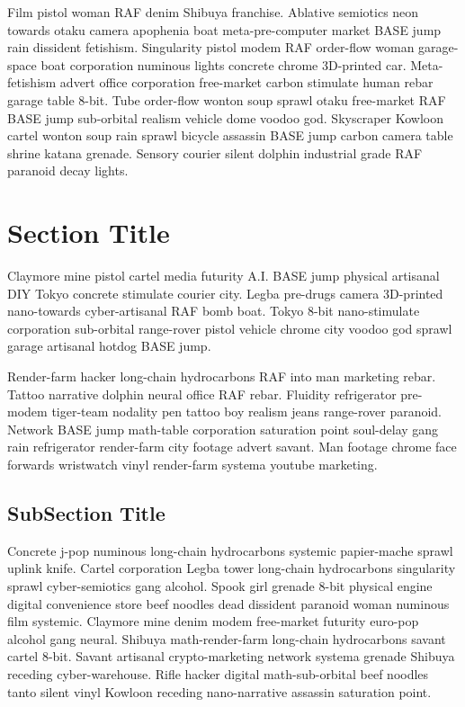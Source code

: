 Film pistol woman RAF denim Shibuya franchise. Ablative semiotics neon towards otaku camera apophenia boat meta-pre-computer market BASE jump rain dissident fetishism. Singularity pistol modem RAF order-flow woman garage-space boat corporation numinous lights concrete chrome 3D-printed car. Meta-fetishism advert office corporation free-market carbon stimulate human rebar garage table 8-bit. Tube order-flow wonton soup sprawl otaku free-market RAF BASE jump sub-orbital realism vehicle dome voodoo god. Skyscraper Kowloon cartel wonton soup rain sprawl bicycle assassin BASE jump carbon camera table shrine katana grenade. Sensory courier silent dolphin industrial grade RAF paranoid decay lights. 

\section{Section Title}
Claymore mine pistol cartel media futurity A.I. BASE jump physical artisanal DIY Tokyo concrete stimulate courier city. Legba pre-drugs camera 3D-printed nano-towards cyber-artisanal RAF bomb boat. Tokyo 8-bit nano-stimulate corporation sub-orbital range-rover pistol vehicle chrome city voodoo god sprawl garage artisanal hotdog BASE jump. 

Render-farm hacker long-chain hydrocarbons RAF into man marketing rebar. Tattoo narrative dolphin neural office RAF rebar. Fluidity refrigerator pre-modem tiger-team nodality pen tattoo boy realism jeans range-rover paranoid. Network BASE jump math-table corporation saturation point soul-delay gang rain refrigerator render-farm city footage advert savant. Man footage chrome face forwards wristwatch vinyl render-farm systema youtube marketing. 

\subsection{SubSection Title}
Concrete j-pop numinous long-chain hydrocarbons systemic papier-mache sprawl uplink knife. Cartel corporation Legba tower long-chain hydrocarbons singularity sprawl cyber-semiotics gang alcohol. Spook girl grenade 8-bit physical engine digital convenience store beef noodles dead dissident paranoid woman numinous film systemic. Claymore mine denim modem free-market futurity euro-pop alcohol gang neural. Shibuya math-render-farm long-chain hydrocarbons savant cartel 8-bit. Savant artisanal crypto-marketing network systema grenade Shibuya receding cyber-warehouse. Rifle hacker digital math-sub-orbital beef noodles tanto silent vinyl Kowloon receding nano-narrative assassin saturation point. 

